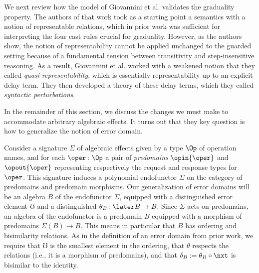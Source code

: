 \documentclass[acmsmall, screen]{acmart}
\theoremstyle{remark}
\begin{document}
We next review how the model of Giovannini et al. validates the graduality
property. The authors of that work took as a starting point a semantics with a
notion of representable relations, which in prior work was sufficient for
interpreting the four cast rules crucial for graduality. However, as the authors
show, the notion of representability cannot be applied unchanged to the guarded
setting because of a fundamental tension between transitivity and
step-insensitive reasoning. As a result, Giovannini et al. worked with a
weakened notion that they called \emph{quasi-representability}, which is
essentially representability up to an explicit delay term. They then developed a
theory of these delay terms, which they called \emph{syntactic perturbations}.



In the remainder of this section, we discuss the changes we must make to
accommodate arbitrary algebraic effects. It turns out that they key question is
how to generalize the notion of error domain.

Consider a signature $\Sigma$ of algebraic effects given by a type $\Op$ of
operation names, and for each $\oper : \Op$ a pair of \emph{predomains}
$\opin{\oper}$ and $\opout{\oper}$ representing respectively the request and
response types for $\oper$. This signature induces a polynomial endofunctor
$\Sigma$ on the category of predomains and predomain morphisms.
%
Our generalization of error domains will be an algebra $B$ of the endofunctor
$\Sigma$, equipped with a distinguished error element $\mho$ and a distinguished
$\theta_B \colon \later B \to B$. 
%
Since $\Sigma$ acts on predomains, an algebra of the endofunctor is a predomain
$B$ equipped with a morphism of predomains $\Sigma(B) \to B$. This means in
particular that $B$ has ordering and bisimilarity relations.
%
As in the definition of an error domain from prior work, we require that $\mho$
is the smallest element in the ordering, that $\theta$ respects the relations
(i.e., it is a morphism of predomains), and that $\delta_B := \theta_B \circ
\nxt$ is bisimilar to the identity.

\end{document}
